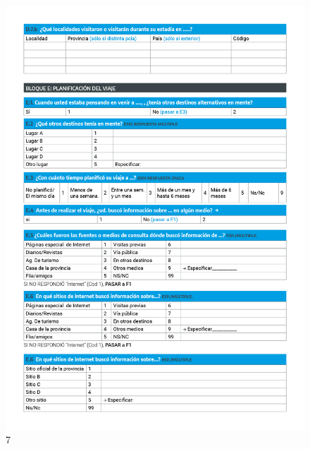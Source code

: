 \documentclass[
]{book}
\begin{document}
\begin{figure}
\includegraphics[width=17.22in]{imagenes/graf07} \caption{7}\label{fig:007}
\end{figure}
\end{document}
